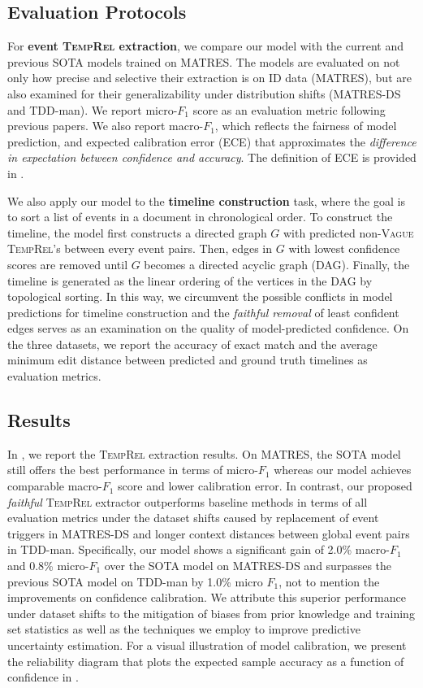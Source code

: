 \documentclass[11pt]{article}
\newcommand{\temprel}{\textsc{TempRel}\xspace}
\begin{document}
\subsection{Evaluation Protocols}
\label{sec:eval_protocol}
For \textbf{event \temprel extraction}, we compare our model with the current and previous SOTA models \cite{trong2022selecting, mathur-etal-2021-timers} trained on MATRES.
The models are evaluated on not only how precise and selective their extraction is on ID data (MATRES), but are also examined for their generalizability under distribution shifts (MATRES-DS and TDD-man).
We report micro-$F_1$ score as an evaluation metric following previous papers.
We also report macro-$F_1$, which reflects the fairness of model prediction,
and expected calibration error (ECE) that approximates the \emph{difference in expectation between confidence and accuracy}. 
The definition of ECE is provided in .

We also apply our model to the \textbf{timeline construction} task, where the goal is to sort a list of events in a document in chronological order.
To construct the timeline, the model first constructs a directed graph $G$ with predicted non-\textsc{Vague} \temprel's between every event pairs. 
Then, edges in $G$ with lowest confidence scores are removed until $G$ becomes a directed acyclic graph (DAG).
Finally, the timeline is generated as the linear ordering of the vertices in the DAG by topological sorting. 
In this way, we circumvent the possible conflicts in model predictions for timeline construction and the \emph{faithful removal} of least confident edges serves as an examination on the quality of model-predicted confidence.
On the three datasets, we report the accuracy of exact match and the average minimum edit distance between predicted and ground truth timelines as evaluation metrics.
\subsection{Results}
\label{sec:results}
In , we report the \temprel extraction results. On MATRES, the SOTA model \cite{trong2022selecting} still offers the best performance in terms of micro-$F_1$ whereas our model achieves comparable macro-$F_1$ score and lower calibration error.
In contrast, our proposed \emph{faithful} \temprel extractor outperforms baseline methods in terms of all evaluation metrics under the dataset shifts caused by replacement of event triggers in MATRES-DS and longer context distances between global event pairs in TDD-man.
Specifically, our model shows a significant gain of 2.0\% macro-$F_1$ and 0.8\% micro-$F_1$ over the SOTA model on MATRES-DS and surpasses the previous SOTA model on TDD-man by 1.0\% micro $F_1$, not to mention the improvements on confidence calibration.
We attribute this superior performance under dataset shifts to the mitigation of biases from prior knowledge and training set statistics as well as the techniques we employ to improve predictive uncertainty estimation.
For a visual illustration of model calibration, we present the reliability diagram that plots the expected sample accuracy as a function of confidence in . 
\end{document}
